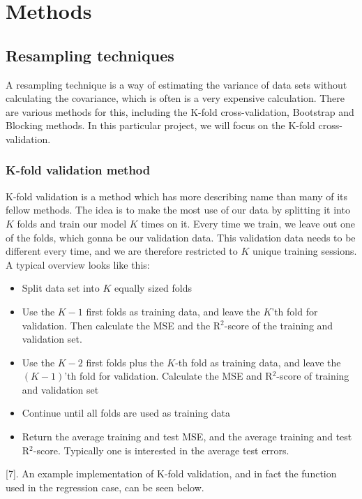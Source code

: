 \section{Methods} \label{sec:methods}

\subsection{Resampling techniques} \label{sec:resampling}
A resampling technique is a way of estimating the variance of data sets without calculating the covariance, which is often is a very expensive calculation. There are various methods for this, including the K-fold cross-validation, Bootstrap and Blocking methods. In this particular project, we will focus on the K-fold cross-validation.

\subsubsection{K-fold validation method} \label{sec:kfold}
K-fold validation is a method which has more describing name than many of its fellow methods. The idea is to make the most use of our data by splitting it into $K$ folds and train our model $K$ times on it. Every time we train, we leave out one of the folds, which gonna be our validation data. This validation data needs to be different every time, and we are therefore restricted to $K$ unique training sessions. A typical overview looks like this:
\begin{itemize}
	\item Split data set into $K$ equally sized folds
	\item Use the $K-1$ first folds as training data, and leave the $K$'th fold for validation. Then calculate the MSE and the R$^2$-score of the training and validation set.
	\item Use the $K-2$ first folds plus the $K$-th fold as training data, and leave the $(K-1)$'th fold for validation. Calculate the MSE and R$^2$-score of training and validation set
	\item Continue until all folds are used as training data
	\item Return the average training and test MSE, and the average training and test R$^2$-score. Typically one is interested in the average test errors. 
\end{itemize}
[7]. An example implementation of K-fold validation, and in fact the function used in the regression case, can be seen below.

